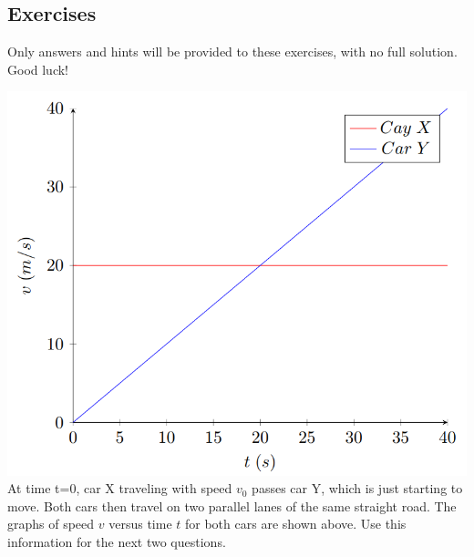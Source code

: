 


\newpage
\subsection*{Exercises}
Only answers and hints will be provided to these exercises, with no full solution. Good luck!




\includegraphics{Figures/Figure11}
\\
At time t=0, car X traveling with speed $v_0$ passes car Y, which is just starting to move. Both cars then travel on two parallel lanes of the same straight road. The graphs of speed $v$ versus time $t$ for both cars are shown above. Use this information for the next two questions.

